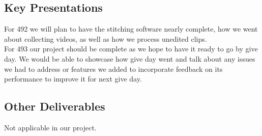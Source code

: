 \subsection{Key Presentations}
For 492 we will plan to have the stitching software nearly complete, how we went 
about collecting videos, as well as how we process unedited clips.\\
For 493 our project should be complete as we hope to have it ready to go by give day.
We would be able to showcase how give day went and talk about any issues we had to
address or features we added to incorporate feedback on its performance to improve 
it for next give day.

\subsection{Other Deliverables}
Not applicable in our project.
